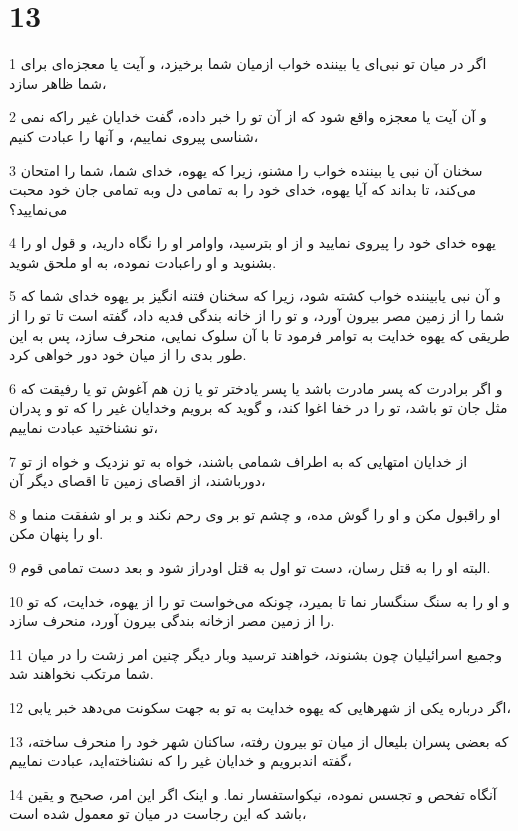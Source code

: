 \chapter{13}

\par 1 اگر در میان تو نبی‌ای یا بیننده خواب ازمیان شما برخیزد، و آیت یا معجزه‌ای برای شما ظاهر سازد،
\par 2 و آن آیت یا معجزه واقع شود که از آن تو را خبر داده، گفت خدایان غیر راکه نمی شناسی پیروی نماییم، و آنها را عبادت کنیم،
\par 3 سخنان آن نبی یا بیننده خواب را مشنو، زیرا که یهوه، خدای شما، شما را امتحان می‌کند، تا بداند که آیا یهوه، خدای خود را به تمامی دل وبه تمامی جان خود محبت می‌نمایید؟
\par 4 یهوه خدای خود را پیروی نمایید و از او بترسید، واوامر او را نگاه دارید، و قول او را بشنوید و او راعبادت نموده، به او ملحق شوید. 
\par 5 و آن نبی یابیننده خواب کشته شود، زیرا که سخنان فتنه انگیز بر یهوه خدای شما که شما را از زمین مصر بیرون آورد، و تو را از خانه بندگی فدیه داد، گفته است تا تو را از طریقی که یهوه خدایت به توامر فرمود تا با آن سلوک نمایی، منحرف سازد، پس به این طور بدی را از میان خود دور خواهی کرد.
\par 6 و اگر برادرت که پسر مادرت باشد یا پسر یادختر تو یا زن هم آغوش تو یا رفیقت که مثل جان تو باشد، تو را در خفا اغوا کند، و گوید که برویم وخدایان غیر را که تو و پدران تو نشناختید عبادت نماییم،
\par 7 از خدایان امتهایی که به اطراف شمامی باشند، خواه به تو نزدیک و خواه از تو دورباشند، از اقصای زمین تا اقصای دیگر آن،
\par 8 او راقبول مکن و او را گوش مده، و چشم تو بر وی رحم نکند و بر او شفقت منما و او را پنهان مکن.
\par 9 البته او را به قتل رسان، دست تو اول به قتل اودراز شود و بعد دست تمامی قوم.
\par 10 و او را به سنگ سنگسار نما تا بمیرد، چونکه می‌خواست تو را از یهوه، خدایت، که تو را از زمین مصر ازخانه بندگی بیرون آورد، منحرف سازد.
\par 11 وجمیع اسرائیلیان چون بشنوند، خواهند ترسید وبار دیگر چنین امر زشت را در میان شما مرتکب نخواهند شد.
\par 12 اگر درباره یکی از شهرهایی که یهوه خدایت به تو به جهت سکونت می‌دهد خبر یابی،
\par 13 که بعضی پسران بلیعال از میان تو بیرون رفته، ساکنان شهر خود را منحرف ساخته، گفته اندبرویم و خدایان غیر را که نشناخته‌اید، عبادت نماییم،
\par 14 آنگاه تفحص و تجسس نموده، نیکواستفسار نما. و اینک اگر این امر، صحیح و یقین باشد که این رجاست در میان تو معمول شده است،
